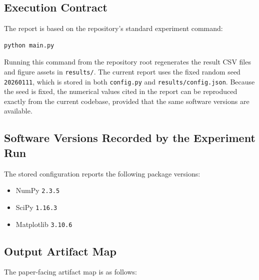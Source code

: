 \subsection{Execution Contract}

The report is based on the repository's standard experiment command:

\begin{verbatim}
python main.py
\end{verbatim}

Running this command from the repository root regenerates the result CSV files and figure assets in \texttt{results/}. The current report uses the fixed random seed \texttt{20260111}, which is stored in both \texttt{config.py} and \texttt{results/config.json}. Because the seed is fixed, the numerical values cited in the report can be reproduced exactly from the current codebase, provided that the same software versions are available.

\subsection{Software Versions Recorded by the Experiment Run}

The stored configuration reports the following package versions:

\begin{itemize}
\item NumPy \texttt{2.3.5}
\item SciPy \texttt{1.16.3}
\item Matplotlib \texttt{3.10.6}
\end{itemize}

\subsection{Output Artifact Map}

The paper-facing artifact map is as follows:

